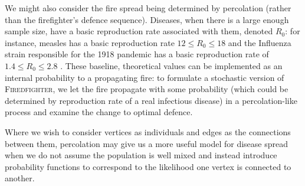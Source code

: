 \documentclass[../report.tex]{subfiles}
\begin{document}
We might also consider the fire spread being determined by percolation (rather than the firefighter's defence sequence). Diseases, when there is a large enough sample size, have a basic reproduction rate associated with them, denoted $R_0$: for instance, measles has a basic reproduction rate $12\leq R_0 \leq 18$ \cite{guerra_2017} and the Influenza strain responsible for the 1918 pandemic has a basic reproduction rate of $1.4 \leq R_0 \leq 2.8$ \cite{ferguson_2006}. These baseline, theoretical values can be implemented as an internal probability to a propagating fire: to formulate a stochastic version of {\scshape Firedfighter}, we let the fire propagate with some probability (which could be determined by reproduction rate of a real infectious disease) in a percolation-like process and examine the change to optimal defence.

Where we wish to consider vertices as individuals and edges as the connections between them, percolation may give us a more useful model for disease spread when we do not assume the population is well mixed and instead introduce probability functions to correspond to the likelihood one vertex is connected to another.
\end{document}
